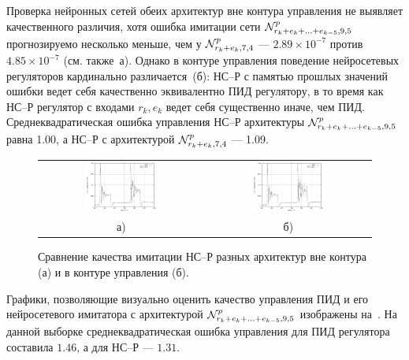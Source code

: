 Проверка нейронных сетей обеих архитектур вне контура управления не
выявляет качественного различия, хотя ошибка имитации сети
$\mathcal{N}^p_{r_k+e_k+\ldots+e_{k-5},9,5}$ прогнозируемо несколько меньше,
чем у $\mathcal{N}^p_{r_k+e_k,7,4}$ --- $2.89\times 10^{-7}$ против $4.85\times
10^{-7}$ (см. также~а).  Однако в
контуре управления поведение нейросетевых регуляторов кардинально
различается~(б): НС--Р с памятью
прошлых значений ошибки ведет себя качественно эквивалентно ПИД
регулятору, в то время как НС--Р регулятор с входами $r_k,e_k$ ведет
себя существенно иначе, чем ПИД.  Среднеквадратическая ошибка
управления НС--Р архитектуры $\mathcal{N}^p_{r_k+e_k+\ldots+e_{k-5},9,5}$
равна 1.00, а НС--Р с архитектурой $\mathcal{N}^p_{r_k+e_k,7,4}$ --- 1.09.

\begin{figure}[h]
  \centering
  \begin{tabular}{cc}
    \includegraphics[width=0.45\textwidth,%
      totalheight=0.25\textheight]{cstr_e5r1_vs_e1r1_outloop_rus}
    &
    \includegraphics[width=0.45\textwidth,%
      totalheight=0.25\textheight]{cstr_e5r1_vs_e1r1_inloop_rus} \\
    а) & б) \\
  \end{tabular}
  \caption{Сравнение качества имитации НС--Р разных архитектур вне контура (а) и в контуре управления (б).}%
  \label{fig:cstr_pid_vs_nnc_contest_rus}
\end{figure}

Графики, позволяющие визуально оценить качество управления ПИД и его
нейросетевого имитатора с архитектурой
$\mathcal{N}^p_{r_k+e_k+\ldots+e_{k-5},9,5}$ изображены
на~.  На данной выборке
среднеквадратическая ошибка управления для ПИД регулятора составила
$1.46$, а для НС--Р --- $1.31$.

